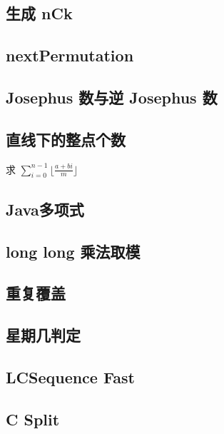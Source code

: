 \documentclass[landscape, twocolumn, 8pt, a4paper, twoside]{extarticle}
\begin{document}
\begin{spacing}{0.1}
\subsection{生成 nCk}


\subsection{nextPermutation}


\subsection{Josephus 数与逆 Josephus 数}


\subsection{直线下的整点个数}
求 $\sum_{i=0}^{n-1} \lfloor\frac{a+bi}{m}\rfloor$


\subsection{Java多项式}


\subsection{long long 乘法取模}


\subsection{重复覆盖}


\subsection{星期几判定}


\subsection{LCSequence Fast}


\subsection{C Split}



\end{spacing}
\end{document}
